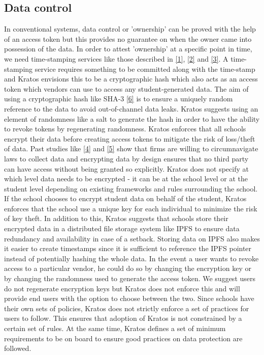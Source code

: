 \documentclass{article}
\begin{document}
\subsection{Data control}
In conventional systems, data control or 'ownership' can be proved with the help of an access token but this provides no guarantee on when the owner came into possession of the data. In order to attest 'ownership' at a specific point in time, we need time-stamping services like those described in \hyperref[sec:1]{[1]}, \hyperref[sec:2]{[2]} and \hyperref[sec:3]{[3]}. A time-stamping service requires something to be committed along with the time-stamp and Kratos envisions this to be a cryptographic hash which also acts as an access token which vendors can use to access any student-generated data.
\bigbreak
The aim of using a cryptographic hash like SHA-3 \hyperref[sec:6]{[6]} is to ensure a uniquely random reference to the data to avoid out-of-channel data leaks. Kratos suggests using an element of randomness like a salt to generate the hash in order to have the ability to revoke tokens by regenerating randomness. Kratos enforces that all schools encrypt their data before creating access tokens to mitigate the risk of loss/theft of data. Past studies like \hyperref[sec:4]{[4]} and \hyperref[sec:5]{[5]} show that firms are willing to circumnavigate laws to collect data and encrypting data by design ensures that no third party can have access without being granted so explicitly.
\bigbreak
Kratos does not specify at which level data needs to be encrypted - it can be at the school level or at the student level depending on existing frameworks and rules surrounding the school. If the school chooses to encrypt student data on behalf of the student, Kratos enforces that the school use a unique key for each individual to minimize the risk of key theft. In addition to this, Kratos suggests that schools store their encrypted data in a distributed file storage system like IPFS to ensure data redundancy and availability in case of a setback. Storing data on IPFS also makes it easier to create timestamps since it is sufficient to reference the IPFS pointer instead of potentially hashing the whole data.
\bigbreak
In the event a user wants to revoke access to a particular vendor, he could do so by changing the encryption key or by changing the randomness used to generate the access token. We suggest users do not regenerate encryption keys but Kratos does not enforce this and will provide end users with the option to choose between the two.
\bigbreak
Since schools have their own sets of policies, Kratos does not strictly enforce a set of practices for users to follow. This ensures that adoption of Kratos is not constrained by a certain set of rules. At the same time, Kratos defines a set of minimum requirements to be on board to ensure good practices on data protection are followed.
\end{document}

